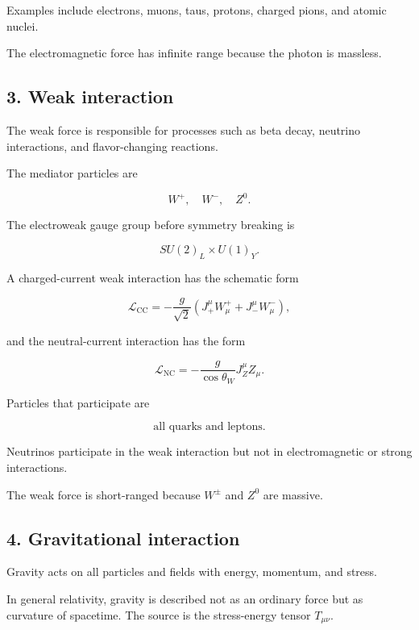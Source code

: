 \documentclass[12pt]{article}
\begin{document}
Examples include electrons, muons, taus, protons, charged pions, and atomic nuclei.

The electromagnetic force has infinite range because the photon is massless.

\subsection*{3. Weak interaction}

The weak force is responsible for processes such as beta decay, neutrino interactions, and flavor-changing reactions.

The mediator particles are

\[
W^+,\quad W^-,\quad Z^0.
\]

The electroweak gauge group before symmetry breaking is

\begin{equation}
SU(2)_L \times U(1)_Y.
\end{equation}

A charged-current weak interaction has the schematic form

\begin{equation}
\mathcal{L}_{\text{CC}}=-\frac{g}{\sqrt{2}}
\left(J^\mu_+W^+_\mu+J^\mu_-W^-_\mu\right),
\end{equation}

and the neutral-current interaction has the form

\begin{equation}
\mathcal{L}_{\text{NC}}=-\frac{g}{\cos\theta_W}J^\mu_Z Z_\mu.
\end{equation}

Particles that participate are

\[
\text{all quarks and leptons.}
\]

Neutrinos participate in the weak interaction but not in electromagnetic or strong interactions.

The weak force is short-ranged because $W^\pm$ and $Z^0$ are massive.

\subsection*{4. Gravitational interaction}

Gravity acts on all particles and fields with energy, momentum, and stress.

In general relativity, gravity is described not as an ordinary force but as curvature of spacetime. The source is the stress-energy tensor $T_{\mu\nu}$.
\end{document}
